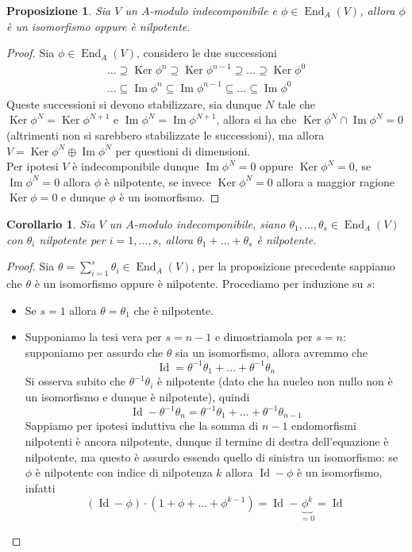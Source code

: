 \documentclass[11pt]{article}
\theoremstyle{plain}
\newtheorem{prop}[thm]{Proposizione}
\newtheorem*{cor}{Corollario}
\theoremstyle{definition}
\theoremstyle{remark}
\DeclareMathOperator{\End}{End}
\DeclareMathOperator{\Ker}{Ker}
\DeclareMathOperator{\Imm}{Im}
\DeclareMathOperator{\Id}{Id}
\begin{document}
	\begin{prop}
		Sia $V$ un $A$-modulo indecomponibile e $\phi\in \End_A(V)$, allora $\phi$ è un isomorfismo oppure è nilpotente.
	\end{prop}
	\begin{proof}
		Sia $\phi\in \End_A(V)$, considero le due successioni
		\begin{gather*}
			\ldots\supseteq \Ker\phi^n\supseteq\Ker\phi^{n-1}\supseteq\ldots\supseteq\Ker\phi^0\\
			\ldots\subseteq\Imm\phi^n\subseteq\Imm\phi^{n-1}\subseteq\ldots\subseteq\Imm\phi^0
		\end{gather*}
		Queste successioni si devono stabilizzare, sia dunque $N$ tale che $\Ker\phi^N=\Ker\phi^{N+1}$ e $\Imm\phi^N=\Imm\phi^{N+1}$, allora si ha che $\Ker\phi^N\cap\Imm\phi^N=0$ (altrimenti non si sarebbero stabilizzate le successioni), ma allora $V=\Ker\phi^N\oplus\Imm\phi^N$ per questioni di dimensioni.\\
		Per ipotesi $V$ è indecomponibile dunque $\Imm\phi^N=0$ oppure $\Ker\phi^N=0$, se $\Imm\phi^N=0$ allora $\phi$ è nilpotente, se invece $\Ker\phi^N=0$ allora a maggior ragione $\Ker \phi=0$ e dunque $\phi$ è un isomorfismo.
	\end{proof}
	\begin{cor}
		Sia $V$ un $A$-modulo indecomponibile, siano $\theta_1,\ldots,\theta_s\in \End_A(V)$ con $\theta_i$ nilpotente per $i=1,\ldots,s$, allora $\theta_1+\ldots+\theta_s$ è nilpotente.
	\end{cor}
	\begin{proof}
		Sia $\displaystyle \theta=\sum_{i=1}^{s}\theta_i\in \End_A(V)$, per la proposizione precedente sappiamo che $\theta$ è un isomorfismo oppure è nilpotente. Procediamo per induzione su $s$:
		\begin{itemize}
			\item Se $s=1$ allora $\theta=\theta_1$ che è nilpotente.
			\item Supponiamo la tesi vera per $s=n-1$ e dimostriamola per $s=n$: supponiamo per assurdo che $\theta$ sia un isomorfismo, allora avremmo che
			\[
				\Id = \theta^{-1}\theta_1+\ldots+\theta^{-1}\theta_n
			\]
			Si osserva subito che $\theta^{-1}\theta_i$ è nilpotente (dato che ha nucleo non nullo non è un isomorfismo e dunque è nilpotente), quindi
			\[
				\Id-\theta^{-1}\theta_n = \theta^{-1}\theta_1+\ldots+\theta^{-1}\theta_{n-1}
			\]
			Sappiamo per ipotesi induttiva che la somma di $n-1$ endomorfismi nilpotenti è ancora nilpotente, dunque il termine di destra dell'equazione è nilpotente, ma questo è assurdo essendo quello di sinistra un isomorfismo: se $\phi$ è nilpotente con indice di nilpotenza $k$ allora $\Id-\phi$ è un isomorfismo, infatti
			\[
				(\Id-\phi)\cdot(1+\phi+\ldots+\phi^{k-1}) = \Id-\underbrace{\phi^k}_{=0} = \Id
			\]
		\end{itemize}
	\end{proof}
	
\end{document}
